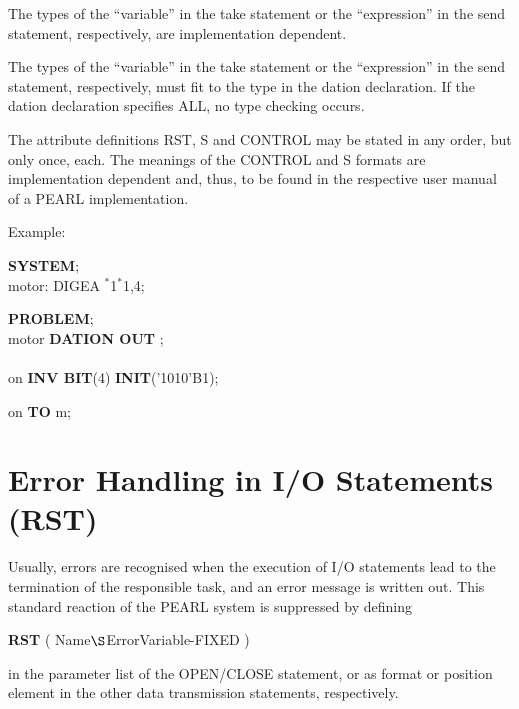 \begin{removed}
The types of the ``variable'' in the take statement or the
``expression'' in the send statement, respectively, are implementation
dependent.
\end{removed}
\begin{added}
The types of the ``variable'' in the take statement or the
``expression'' in the send statement, respectively, must fit to 
the type in the dation declaration. If the dation declaration 
specifies ALL, no type checking occurs.
\end{added}

\begin{removed}
The attribute definitions RST, S and CONTROL may be stated in any
order, but only once, each. The meanings of the CONTROL and S formats
are implementation dependent and, thus, to be found in the respective
user manual of a PEARL implementation.
\end{removed}

Example:

\begin{removed}
{\bf SYSTEM};\\
\x motor: DIGEA $^*$1$^*$1,4;
\end{removed}

{\bf PROBLEM};\\
 motor {\bf DATION OUT  
     };\\
\x {}\\
 on {\bf INV BIT}(4) {\bf INIT}('1010'B1);

 on {\bf TO} m;

\section{Error Handling in I/O Statements (RST)}    %
\label{sec_dation_rst}

Usually, errors are recognised when the execution of I/O statements lead to the
termination of the responsible task, and an error message is written
out. This standard reaction of the PEARL system is suppressed by
defining

{\bf RST} ( Name$\S $ErrorVariable-FIXED )

in the parameter list of the OPEN/CLOSE statement, or as format or
position element in the other data transmission statements,
respectively.

